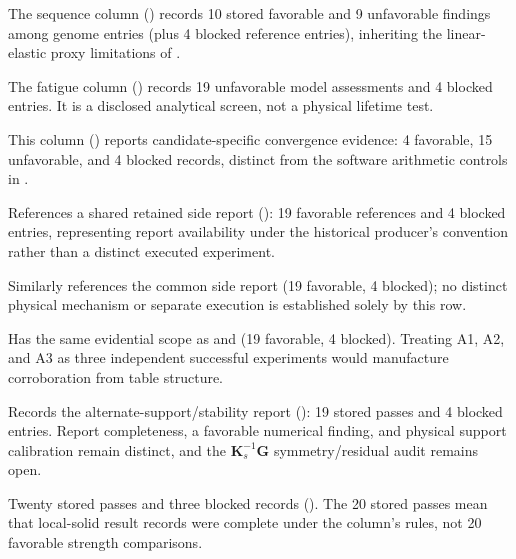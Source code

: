 The sequence column () records 10 stored favorable and 9 unfavorable findings among genome entries (plus 4 blocked reference entries), inheriting the linear-elastic proxy limitations of .

The fatigue column () records 19 unfavorable model assessments and 4 blocked entries. It is a disclosed analytical screen, not a physical lifetime test.

This column () reports candidate-specific convergence evidence: 4 favorable, 15 unfavorable, and 4 blocked records, distinct from the software arithmetic controls in .

References a shared retained side report (): 19 favorable references and 4 blocked entries, representing report availability under the historical producer's convention rather than a distinct executed experiment.

Similarly references the common side report (19 favorable, 4 blocked); no distinct physical mechanism or separate execution is established solely by this row.

Has the same evidential scope as  and  (19 favorable, 4 blocked). Treating A1, A2, and A3 as three independent successful experiments would manufacture corroboration from table structure.

Records the alternate-support/stability report (): 19 stored passes and 4 blocked entries. Report completeness, a favorable numerical finding, and physical support calibration remain distinct, and the  $\mathbf{K}_s^{-1}\mathbf{G}$ symmetry/residual audit remains open.

Twenty stored passes and three blocked records (). The 20 stored passes mean that local-solid result records were complete under the column's rules, not 20 favorable strength comparisons.

